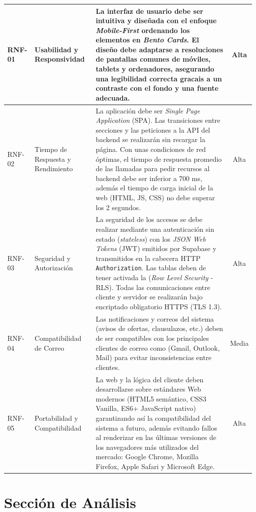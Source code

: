 \begin{center}
\begin{longtable}{|l|p{3.5cm}|p{7.5cm}|c|}
    RNF-01 & Usabilidad y Responsividad & La interfaz de usuario debe ser intuitiva y diseñada con el enfoque \textit{Mobile-First} ordenando los elementos en \textit{Bento Cards}. El diseño debe adaptarse a resoluciones de pantallas comunes de móviles, tablets y ordenadores, asegurando una legibilidad correcta gracais a un contraste con el fondo y una fuente adecuada. & Alta \\ \hline
    RNF-02 & Tiempo de Respuesta y Rendimiento & La aplicación debe ser \textit{Single Page Application} (SPA). Las transiciones entre secciones y las peticiones a la API del backend se realizarán sin recargar la página. Con unas condiciones de red óptimas, el tiempo de respuesta promedio de las llamadas para pedir recursos al backend debe ser inferior a 700 ms, además el tiempo de carga inicial de la web (HTML, JS, CSS) no debe superar los 2 segundos. & Alta \\ \hline
    RNF-03 & Seguridad y Autorización & La seguridad de los accesos se debe realizar mediante una autenticación sin estado (\textit{stateless}) con los \textit{JSON Web Tokens} (JWT) emitidos por Supabase y transmitidos en la cabecera HTTP \texttt{Authorization}. Las tablas deben de tener activada la (\textit{Row Level Security} - RLS). Todas las comunicaciones entre cliente y servidor se realizarán bajo encriptado obligatorio HTTPS (TLS 1.3). & Alta \\ \hline
    RNF-04 & Compatibilidad de Correo & Las notificaciones y correos del sistema (avisos de ofertas, clausulazos, etc.) deben de ser compatibles con los principales clientes de correo  como (Gmail, Outlook, Mail) para evitar inconsistencias entre clientes. & Media \\ \hline
    RNF-05 & Portabilidad y Compatibilidad & La  web y la lógica del cliente deben desarrollarse sobre estándares Web modernos (HTML5 semántico, CSS3 Vanilla, ES6+ JavaScript nativo) garantizando así la compatibilidad del sistema a futuro, además evitando fallos al renderizar en las últimas versiones de los navegadores más utilizados del mercado: Google Chrome, Mozilla Firefox, Apple Safari y Microsoft Edge. & Alta \\ \hline
\end{longtable}
\end{center}

\section{Sección de Análisis}
\label{sec:seccion_analisis}

